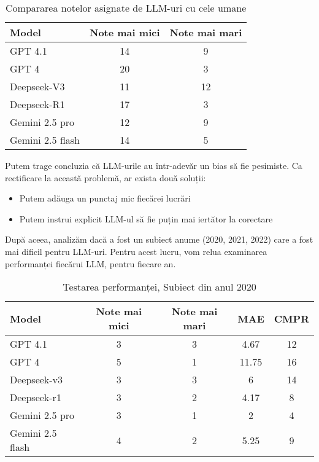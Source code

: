 \documentclass[12pt, a4paper]{report}
\begin{document}
\begin{table}[h!]
\centering
\begin{tabular}{|l|c|c|}
\hline
\textbf{Model} & \textbf{Note mai mici} & \textbf{Note mai mari} \\
\hline
GPT 4.1 & 14 & 9 \\
GPT 4 & 20 & 3 \\
Deepseek-V3 & 11 & 12 \\
Deepseek-R1 & 17 & 3 \\
Gemini 2.5 pro & 12 & 9 \\
Gemini 2.5 flash & 14 & 5 \\
\hline
\end{tabular}
\caption{Compararea notelor asignate de LLM-uri cu cele umane}
\end{table}

Putem trage concluzia că LLM-urile au într-adevăr un bias să fie pesimiste. Ca rectificare la această problemă, ar exista două soluții:
\begin{itemize}
\item Putem adăuga un punctaj mic fiecărei lucrări
\item Putem instrui explicit LLM-ul să fie puțin mai iertător la corectare
\end{itemize}






După aceea, analizăm dacă a fost un subiect anume (2020, 2021, 2022) care a fost mai dificil pentru LLM-uri.
Pentru acest lucru, vom relua examinarea performanței fiecărui LLM, pentru fiecare an.

\begin{table}[H]
\centering
\begin{tabular}{|l|c|c|c|c|}
\hline
\textbf{Model}         & \textbf{Note mai mici} & \textbf{Note mai mari} & \textbf{MAE} & \textbf{CMPR} \\
\hline
GPT 4.1                & 3               & 3                & 4.67         & 12    \\
GPT 4                  & 5               & 1                & 11.75        & 16    \\
Deepseek-v3            & 3               & 3                & 6            & 14    \\
Deepseek-r1            & 3               & 2                & 4.17         & 8     \\
Gemini 2.5 pro         & 3               & 1                & 2            & 4     \\
Gemini 2.5 flash       & 4               & 2                & 5.25         & 9     \\
\hline
\end{tabular}
\caption{Testarea performanței, Subiect din anul 2020}
\end{table}
\end{document}

